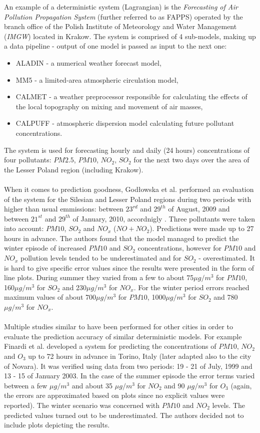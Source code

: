 An example of a deterministic system (Lagrangian) is the \textit{Forecasting of Air Pollution Propagation System} (further referred to as FAPPS) \cite{HAJTO2012FAPPS} operated by the branch office of the Polish Institute of Meteorology and Water Management (\textit{IMGW}) located in Krakow. The system is comprised of 4 sub-models, making up a data pipeline - output of one model is passed as input to the next one:
\begin{itemize}
    \item ALADIN - a numerical weather forecast model,
    \item MM5 - a limited-area atmospheric circulation model,
    \item CALMET - a weather preprocessor responsible for calculating the effects of the local topography on mixing and movement of air masses,
    \item CALPUFF - atmospheric dispersion model calculating future pollutant concentrations.
\end{itemize}
The system is used for forecasting hourly and daily (24 hours) concentrations of four pollutants: $PM2.5$, $PM10$, $NO_2$, $SO_2$ for the next two days over the area of the Lesser Poland region (including Krakow).
\\\\
When it comes to prediction goodness, Godłowska et al. performed an evaluation of the system for the Silesian and Lesser Poland regions during two periods with higher than usual emmissions: between $23^{rd}$ and $29^{th}$ of August, 2009 and between $21^{st}$ and $29^{th}$ of January, 2010, accordnigly \cite{GODLOWSKA2011}. Three pollutants were taken into account: $PM10$, $SO_2$ and $NO_x$ ($NO + NO_2$). Predictions were made up to 27 hours in advance. The authors found that the model managed to predict the winter episode of increased $PM10$ and $SO_2$ concentrations, however for $PM10$ and $NO_x$ pollution levels tended to be underestimated and for $SO_2$ - overestimated. It is hard to give specific error values since the results were presented in the form of line plots. During summer they varied from a few to about 75$\mu g/m^3$ for $PM10$, 160$\mu g/m^3$ for $SO_2$ and 230$\mu g/m^3$ for $NO_x$. For the winter period errors reached maximum values of about 700$\mu g/m^3$ for $PM10$, 1000$\mu g/m^3$ for $SO_2$ and 780$\mu g/m^3$ for $NO_x$.
\\\\
Multiple studies similar to \cite{GODLOWSKA2011} have been performed for other cities in order to evaluate the prediction accuracy of similar deterministic models. For example Finardi et al. \cite{FINARDI2008} developed a system for predicting the  concentrations of $PM10$, $NO_2$ and $O_3$ up to 72 hours in advance in Torino, Italy (later adapted also to the city of Novara). It was verified using data from two periods: 19 - 21 of July, 1999 and 13 - 15 of January 2003. In the case of the summer episode the error terms varied between a few $\mu g/m^3$ and about 35 $\mu g/m^3$ for $NO_2$ and 90 $\mu g/m^3$ for $O_3$ (again, the errors are approximated based on plots since no explicit values were reported). The winter scenario was concerned with $PM10$ and $NO_2$ levels. The predicted values turned out to be underestimated. The authors decided not to include plots depicting the results.
